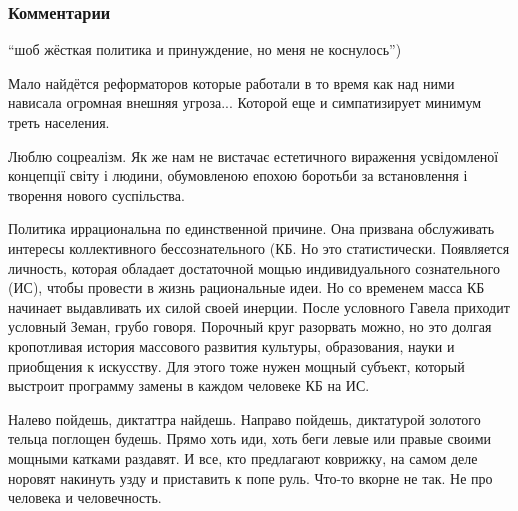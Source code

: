  
 
 
 
 
\subsubsection{Комментарии}
\begin{itemize}


\enquote{шоб жёсткая политика и принуждение, но меня не коснулось})


Мало найдётся реформаторов которые работали в то время как над ними нависала
огромная внешняя угроза... Которой еще и симпатизирует минимум треть населения.


Люблю соцреалізм. Як же нам не вистачає естетичного вираження усвідомленої
концепції світу і людини, обумовленою епохою боротьби за встановлення і
творення нового суспільства.


Политика иррациональна по единственной причине. Она призвана обслуживать
интересы коллективного бессознательного (КБ. Но это статистически. Появляется
личность, которая обладает достаточной мощью индивидуального сознательного
(ИС), чтобы провести в жизнь рациональные идеи. Но со временем масса КБ
начинает выдавливать их силой своей инерции. После условного Гавела приходит
условный Земан, грубо говоря. Порочный круг разорвать можно, но это долгая
кропотливая история массового развития культуры, образования, науки и
приобщения к искусству. Для этого тоже нужен мощный субъект, который выстроит
программу замены в каждом человеке КБ на ИС.


Налево пойдешь, диктаттра найдешь. Направо пойдешь, диктатурой золотого тельца
поглощен будешь. Прямо хоть иди, хоть беги левые или правые своими мощными
катками раздавят.  И все, кто предлагают коврижку, на самом деле норовят
накинуть узду и приставить к попе руль.  Что-то вкорне не так. Не про человека
и человечность.


\end{itemize}
